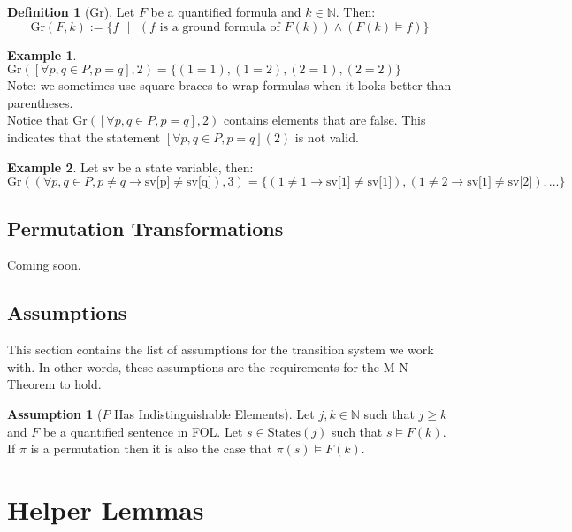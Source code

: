 \documentclass[12pt]{article}
\theoremstyle{definition}
\newtheorem{assumption}{Assumption}
\newtheorem{definition}{Definition}
\newtheorem{example}{Example}
\theoremstyle{remark}
\newcommand{\st}{\text{ }|\text{ }}
\newcommand{\states}{\text{States}}
\newcommand{\gr}{\text{Gr}}
\begin{document}
\begin{definition}[Gr]
  Let $F$ be a quantified formula and $k \in \mathbb{N}$.  Then:
  $$\gr(F,k) := \{f \st (f \text{ is a ground formula of } F(k)) \land (F(k) \models f)\}$$
\end{definition}

\begin{example}
  $\gr([\forall p,q \in P, p=q],2) = \{(1=1),(1=2),(2=1),(2=2)\}$\\
  Note: we sometimes use square braces to wrap formulas when it looks better than parentheses.\\
  Notice that $\gr([\forall p,q \in P, p=q],2)$ contains elements that are false.  This indicates that the statement $[\forall p,q \in P, p=q](2)$ is not valid.
\end{example}
\begin{example}
  Let $\text{sv}$ be a state variable, then:
  $$\gr((\forall p,q \in P, p \neq q \rightarrow \text{sv[p]} \neq \text{sv[q]}),3) = \{(1 \neq 1 \rightarrow \text{sv[1]} \neq \text{sv[1]}),(1 \neq 2 \rightarrow \text{sv[1]} \neq \text{sv[2]}),...\}$$
\end{example}

\subsection{Permutation Transformations}
Coming soon.

\subsection{Assumptions}
This section contains the list of assumptions for the transition system we work with.  In other words, these assumptions are the requirements for the M-N Theorem to hold.
\begin{assumption}[$P$ Has Indistinguishable Elements]
  \label{asmp:indist}
  Let $j,k \in \mathbb{N}$ such that $j \geq k$ and $F$ be a quantified sentence in FOL.  Let $s \in \states(j)$ such that $s \models F(k)$.  If $\pi$ is a permutation then it is also the case that $\pi(s) \models F(k)$.
\end{assumption}



\section{Helper Lemmas}
\end{document}
